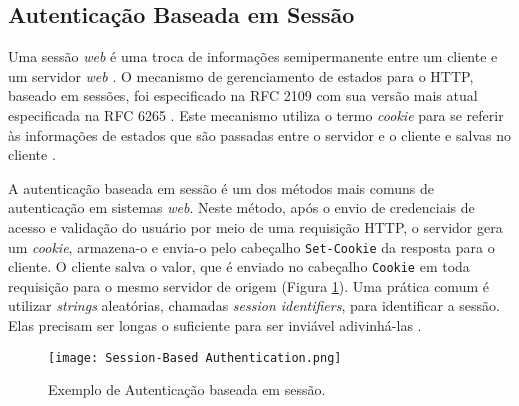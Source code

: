 \subsection{Autenticação Baseada em Sessão}

Uma sessão \emph{web} é uma troca de informações semipermanente entre um cliente e um servidor \emph{web} 
\cite{CALZAVARA2017}. O mecanismo de gerenciamento de estados para o HTTP, baseado em sessões, foi 
especificado na RFC 2109 \cite{RFC2109} com sua versão mais atual especificada na RFC 6265 
\cite{RFC6265}. Este mecanismo utiliza o termo \emph{cookie} para se referir às informações de 
estados que são passadas entre o servidor e o cliente e salvas no cliente \cite{RFC2109}. 

A autenticação baseada em sessão é um dos métodos mais comuns de autenticação em sistemas \emph{web}. 
Neste método, após o envio de credenciais de acesso e validação do usuário por meio de uma requisição 
HTTP, o servidor gera um \emph{cookie}, armazena-o e envia-o pelo cabeçalho \texttt{Set-Cookie} da 
resposta para o cliente. O cliente salva o valor, que é enviado no cabeçalho \texttt{Cookie} em 
toda requisição para o mesmo servidor de origem \cite{PAPATHANASAKI2022} 
(Figura \ref{fig:sessionAuth}). Uma prática comum é utilizar \emph{strings} aleatórias, chamadas 
\emph{session identifiers}, para identificar a sessão. Elas precisam ser longas o suficiente para 
ser inviável adivinhá-las \cite{DRHOVA2018}.

\begin{figure}[ht]
  \centering
  \texttt{[image: Session-Based Authentication.png]}
  \caption{Exemplo de Autenticação baseada em sessão.}
  \label{fig:sessionAuth}
\end{figure}

\

\